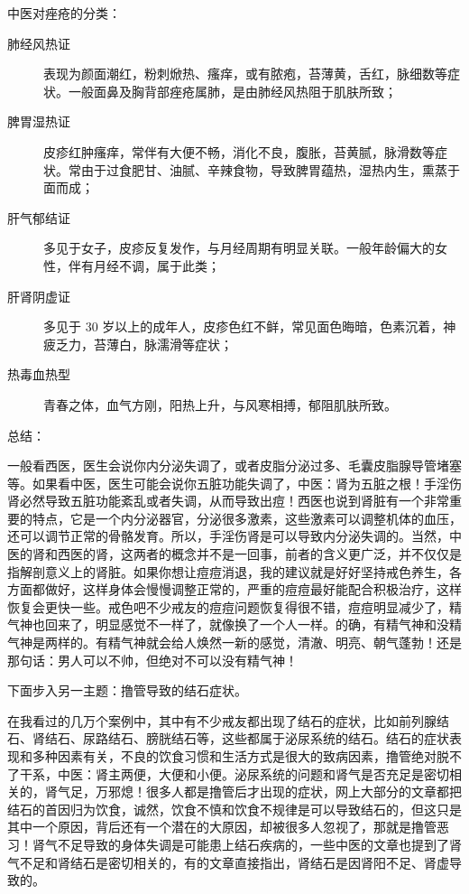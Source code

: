 中医对痤疮的分类：
\begin{description}
    \item[肺经风热证] 表现为颜面潮红，粉刺焮热、瘙痒，或有脓疱，苔薄黄，舌红，脉细数等症状。一般面鼻及胸背部痤疮属肺，是由肺经风热阻于肌肤所致；
    \item[脾胃湿热证] 皮疹红肿瘙痒，常伴有大便不畅，消化不良，腹胀，苔黄腻，脉滑数等症状。常由于过食肥甘、油腻、辛辣食物，导致脾胃蕴热，湿热内生，熏蒸于面而成；
    \item[肝气郁结证] 多见于女子，皮疹反复发作，与月经周期有明显关联。一般年龄偏大的女性，伴有月经不调，属于此类；
    \item[肝肾阴虚证] 多见于 30 岁以上的成年人，皮疹色红不鲜，常见面色晦暗，色素沉着，神疲乏力，苔薄白，脉濡滑等症状；
    \item[热毒血热型] 青春之体，血气方刚，阳热上升，与风寒相搏，郁阻肌肤所致。
\end{description}

总结：

一般看西医，医生会说你内分泌失调了，或者皮脂分泌过多、毛囊皮脂腺导管堵塞等。如果看中医，医生可能会说你五脏功能失调了，中医：肾为五脏之根！手淫伤肾必然导致五脏功能紊乱或者失调，从而导致出痘！西医也说到肾脏有一个非常重要的特点，它是一个内分泌器官，分泌很多激素，这些激素可以调整机体的血压，还可以调节正常的骨骼发育。所以，手淫伤肾是可以导致内分泌失调的。当然，中医的肾和西医的肾，这两者的概念并不是一回事，前者的含义更广泛，并不仅仅是指解剖意义上的肾脏。如果你想让痘痘消退，我的建议就是好好坚持戒色养生，各方面都做好，这样身体会慢慢调整正常的，严重的痘痘最好能配合积极治疗，这样恢复会更快一些。戒色吧不少戒友的痘痘问题恢复得很不错，痘痘明显减少了，精气神也回来了，明显感觉不一样了，就像换了一个人一样。的确，有精气神和没精气神是两样的。有精气神就会给人焕然一新的感觉，清澈、明亮、朝气蓬勃！还是那句话：男人可以不帅，但绝对不可以没有精气神！

下面步入另一主题：撸管导致的结石症状。

在我看过的几万个案例中，其中有不少戒友都出现了结石的症状，比如前列腺结石、肾结石、尿路结石、膀胱结石等，这些都属于泌尿系统的结石。结石的症状表现和多种因素有关，不良的饮食习惯和生活方式是很大的致病因素，撸管绝对脱不了干系，中医：肾主两便，大便和小便。泌尿系统的问题和肾气是否充足是密切相关的，肾气足，万邪熄！很多人都是撸管后才出现的症状，网上大部分的文章都把结石的首因归为饮食，诚然，饮食不慎和饮食不规律是可以导致结石的，但这只是其中一个原因，背后还有一个潜在的大原因，却被很多人忽视了，那就是撸管恶习！肾气不足导致的身体失调是可能患上结石疾病的，一些中医的文章也提到了肾气不足和肾结石是密切相关的，有的文章直接指出，肾结石是因肾阳不足、肾虚导致的。

